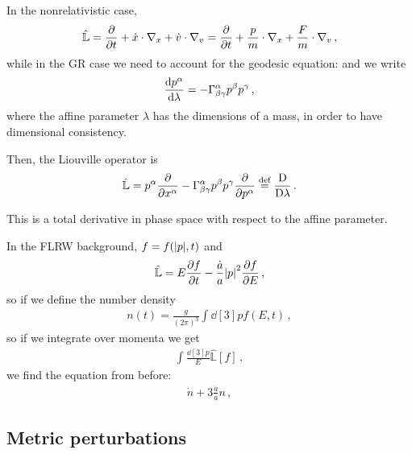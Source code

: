 \documentclass[main.tex]{subfiles}
\begin{document}
In the nonrelativistic case, 
%
\begin{align}
\hat{\mathbb{L}} = \pdv{}{t} + \dot{x} \cdot \nabla_{x} + \dot{v} \cdot \nabla_{v} = \pdv{}{t} + \frac{p}{m} \cdot \nabla_{x} + \frac{F}{m} \cdot \nabla_{v} 
\,,
\end{align}
%
while in the GR case we need to account for the geodesic equation: and we write 
%
\begin{align}
\dv{p^{\alpha }}{\lambda } = - \Gamma^{\alpha }_{\beta \gamma } p^{\beta } p^{\gamma }
\,,
\end{align}
%
where the affine parameter \(\lambda \) has the dimensions of a mass, in order to have dimensional consistency.

Then, the Liouville operator is 
%
\begin{align}
\hat{\mathbb{L}} = p^{\alpha } \pdv{}{x^{\alpha }}-  
\Gamma^{\alpha }_{\beta \gamma } p^{\beta } p^{\gamma } \pdv{}{p^{\alpha }} \overset{\text{def}}{=} \frac{\mathrm{D}}{\mathrm{D}\lambda }
\,.
\end{align}

This is a total derivative in phase space with respect to the affine parameter. 

In the FLRW background, \(f = f(\abs{p}, t)\) and 
%
\begin{align}
\hat{\mathbb{L}} = E \pdv{f}{t} - \frac{\dot{a}}{a} \abs{p}^2 \pdv{f}{E}
\,,
\end{align}
%
so if we define the number density 
%
\begin{align}
n(t) = \frac{g}{(2\pi )^3} \int \dd[3]{p} f(E, t)
\,,
\end{align}
%
so if we integrate over momenta we get 
%
\begin{align}
\int \frac{ \dd[3]{p}}{E} \hat{\mathbb{L}}[f] 
\,,
\end{align}
%
we find the equation from before: 
%
\begin{align}
\dot{n} + 3 \frac{\dot{a}}{a} n 
\,,
\end{align}
%

\subsection{Metric perturbations}
\end{document}
